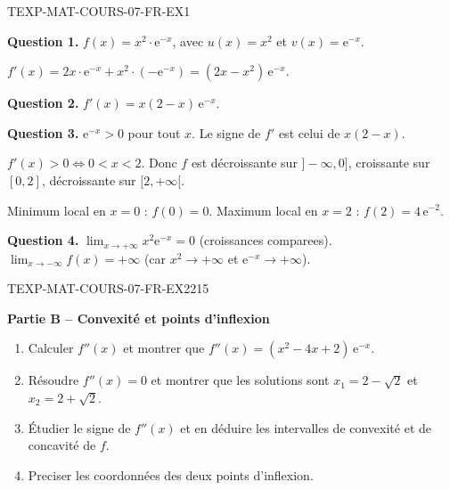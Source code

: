 \begin{corrige}{TEXP-MAT-COURS-07-FR-EX1}

\textbf{Question 1.} $f(x) = x^2 \cdot \mathrm{e}^{-x}$, avec $u(x) = x^2$ et $v(x) = \mathrm{e}^{-x}$.

$f'(x) = 2x \cdot \mathrm{e}^{-x} + x^2 \cdot (-\mathrm{e}^{-x}) = (2x - x^2)\,\mathrm{e}^{-x}$.

\textbf{Question 2.} $f'(x) = x(2-x)\,\mathrm{e}^{-x}$.

\textbf{Question 3.} $\mathrm{e}^{-x} > 0$ pour tout $x$. Le signe de $f'$ est celui de $x(2-x)$.

$f'(x) > 0 \iff 0 < x < 2$. Donc $f$ est décroissante sur $]-\infty, 0]$, croissante sur $[0, 2]$, décroissante sur $[2, +\infty[$.

Minimum local en $x = 0$ : $f(0) = 0$. Maximum local en $x = 2$ : $f(2) = 4\,\mathrm{e}^{-2}$.

\textbf{Question 4.} $\lim_{x \to +\infty} x^2 \mathrm{e}^{-x} = 0$ (croissances comparees). $\lim_{x \to -\infty} f(x) = +\infty$ (car $x^2 \to +\infty$ et $\mathrm{e}^{-x} \to +\infty$).

\end{corrige}

\bigskip


\begin{exercice}{TEXP-MAT-COURS-07-FR-EX2}{2}{15}

\textbf{Partie B -- Convexité et points d'inflexion}

\begin{enumerate}
  \item Calculer $f''(x)$ et montrer que $f''(x) = (x^2 - 4x + 2)\,\mathrm{e}^{-x}$.
  \item Résoudre $f''(x) = 0$ et montrer que les solutions sont $x_1 = 2 - \sqrt{2}$ et $x_2 = 2 + \sqrt{2}$.
  \item Étudier le signe de $f''(x)$ et en déduire les intervalles de convexité et de concavité de $f$.
  \item Preciser les coordonnées des deux points d'inflexion.
\end{enumerate}

\end{exercice}


